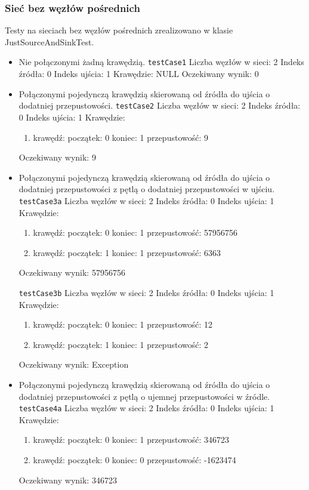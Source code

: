 \subsubsection{Sieć bez węzłów pośrednich}
Testy na sieciach bez węzłów pośrednich zrealizowano w klasie JustSourceAndSinkTest.
\begin{itemize}[nosep]
    \item Nie połączonymi żadną krawędzią.
    \texttt{testCase1}
    Liczba węzłów w sieci: 2
    Indeks źródła: 0
    Indeks ujścia: 1
    Krawędzie: NULL
    Oczekiwany wynik: 0

    \item Połączonymi pojedynczą krawędzią skierowaną od źródła do ujścia o dodatniej przepustowości.
    \texttt{testCase2}
    Liczba węzłów w sieci: 2
    Indeks źródła: 0
    Indeks ujścia: 1
    Krawędzie:
    \begin{enumerate}[nosep]
        \item krawędź:
        początek: 0
        koniec: 1
        przepustowość: 9
    \end{enumerate}
    Oczekiwany wynik: 9

    \item Połączonymi pojedynczą krawędzią skierowaną od źródła do ujścia o dodatniej przepustowości z pętlą o dodatniej przepustowości w ujściu.
    \texttt{testCase3a}
    Liczba węzłów w sieci: 2
    Indeks źródła: 0
    Indeks ujścia: 1
    Krawędzie:
    \begin{enumerate}[nosep]
        \item krawędź:
        początek: 0
        koniec: 1
        przepustowość: 57956756
        \item krawędź:
        początek: 1
        koniec: 1
        przepustowość: 6363
    \end{enumerate}
    Oczekiwany wynik: 57956756

    \texttt{testCase3b}
    Liczba węzłów w sieci: 2
    Indeks źródła: 0
    Indeks ujścia: 1
    Krawędzie:
    \begin{enumerate}[nosep]
        \item krawędź:
        początek: 0
        koniec: 1
        przepustowość: 12
        \item krawędź:
        początek: 1
        koniec: 1
        przepustowość: 2
    \end{enumerate}
    Oczekiwany wynik: Exception

    \item Połączonymi pojedynczą krawędzią skierowaną od źródła do ujścia o dodatniej przepustowości z pętlą o ujemnej przepustowości w źródle.
    \texttt{testCase4a}
    Liczba węzłów w sieci: 2
    Indeks źródła: 0
    Indeks ujścia: 1
    Krawędzie:
    \begin{enumerate}[nosep]
        \item krawędź:
        początek: 0
        koniec: 1
        przepustowość: 346723
        \item krawędź:
        początek: 0
        koniec: 0
        przepustowość: -1623474
    \end{enumerate}
    Oczekiwany wynik: 346723


\end{itemize}
